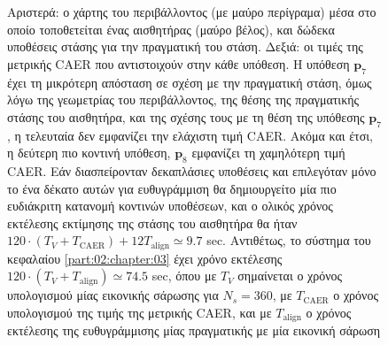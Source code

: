 \begin{figure}\centering
  \vspace{-2.5cm}
  
  \vspace{-2.5cm}
  \caption{\small Αριστερά: ο χάρτης του περιβάλλοντος (με μαύρο περίγραμα) μέσα
           στο οποίο τοποθετείται ένας αισθητήρας (μαύρο βέλος), και δώδεκα
           υποθέσεις στάσης για την πραγματική του στάση. Δεξιά: οι τιμές της
           μετρικής CAER που αντιστοιχούν στην κάθε υπόθεση. Η υπόθεση
           $\bm{p}_7$ έχει τη μικρότερη απόσταση σε σχέση με την πραγματική
           στάση, όμως λόγω της γεωμετρίας του περιβάλλοντος, της θέσης της
           πραγματικής στάσης του αισθητήρα, και της σχέσης τους με τη θέση της
           υπόθεσης $\bm{p}_7$, η τελευταία δεν εμφανίζει την ελάχιστη τιμή
           CAER. Ακόμα και έτσι, η δεύτερη πιο κοντινή υπόθεση, $\bm{p}_8$
           εμφανίζει τη χαμηλότερη τιμή CAER. Εάν διασπείρονταν δεκαπλάσιες
           υποθέσεις και επιλεγόταν μόνο το ένα δέκατο αυτών για ευθυγράμμιση
           θα δημιουργείτο μία πιο ευδιάκριτη κατανομή κοντινών υποθέσεων, και
           ο ολικός χρόνος εκτέλεσης εκτίμησης της στάσης του αισθητήρα θα ήταν
           $120\cdot(T_V + T_{\text{CAER}}) + 12T_{\text{align}}  \simeq 9.7$
           sec. Αντιθέτως, το σύστημα του κεφαλαίου \ref{part:02:chapter:03}
           έχει χρόνο εκτέλεσης $120\cdot(T_V + T_{\text{align}}) \simeq 74.5$
           sec, όπου με $T_V$ σημαίνεται ο χρόνος υπολογισμού μίας εικονικής
           σάρωσης για $N_s=360$, με $T_{\text{CAER}}$ ο χρόνος υπολογισμού της
           τιμής της μετρικής CAER, και με $T_{\text{align}}$ ο χρόνος
           εκτέλεσης της ευθυγράμμισης μίας πραγματικής με μία εικονική σάρωση}
  \label{fig:03_02_01:global_loc}
\end{figure}
